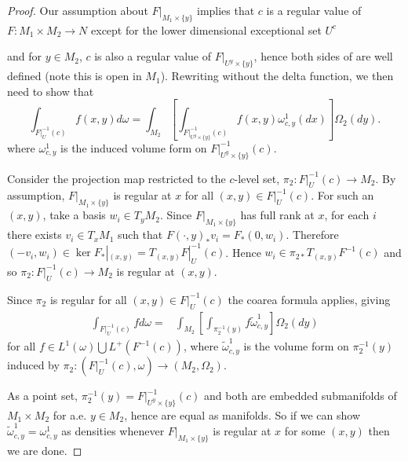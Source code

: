 \begin{proof}
Our assumption about $F|_{M_1\times\{y\}}$ implies that $c$ is a regular value of $F:M_1\times M_2\rightarrow N$ except for the lower dimensional exceptional set $U^c$
\begin{comment}
U is a subset of the set given in the condition.  Both are closed
\end{comment}
and for $y\in M_2$, $c$ is also a regular value of $F|_{U^y\times\{y\}}$, hence both sides of  are well defined (note this is open in $M_1$).  Rewriting  without the delta function, we then need to show that 
\begin{equation}
\int_{F|_U^{-1}(c)} f(x,y) d\omega=\int_{M_2}\left[\int_{F|_{U^y\times\{y\}}^{-1}(c)} f(x,y) \omega^1_{c,y}(dx)\right]\Omega_2(dy).
\end{equation}
where $\omega^1_{c,y}$ is the induced volume form on $F|_{U^y\times\{y\}}^{-1}(c)$.  

Consider the projection map restricted to the $c$-level set, $\pi_2:F|_U^{-1}(c)\rightarrow M_2$.  By assumption, $F|_{M_1\times\{y\}}$ is regular at $x$ for all $(x,y)\in F|_U^{-1}(c)$. For such an $(x,y)$, take a basis $w_i\in T_yM_2$. Since $F|_{M_1\times\{y\}}$ has full rank at $x$, for each $i$ there exists $v_i\in T_xM_1$ such that $F(\cdot,y)_*v_i=F_*(0,w_i)$.  Therefore $(-v_i,w_i)\in \ker F_*|_{(x,y)}=T_{(x,y)}F|_U^{-1}(c)$.  Hence $w_i\in\pi_{2*} T_{(x,y)}F^{-1}(c)$ and so $\pi_2:F|_U^{-1}(c)\rightarrow M_2$ is regular at $(x,y)$.  

Since $\pi_2$ is regular for all $(x,y)\in F|_U^{-1}(c)$ the coarea formula applies, giving
\begin{align}
\int_{F|_U^{-1}(c)}f d\omega=&\int_{M_2}\left[\int_{\pi_2^{-1}(y)}f\tilde{\omega}_{c,y}^1\right]\Omega_2(dy)
\end{align}
for all $f\in L^1(\omega)\bigcup L^+(F^{-1}(c))$, where $\tilde{\omega}_{c,y}^1$ is the volume form on $\pi_2^{-1}(y)$ induced by $\pi_2:(F|_U^{-1}(c),\omega)\rightarrow (M_2,\Omega_2)$.

As a point set, $\pi_2^{-1}(y)=F|_{ U^y\times\{y\}}^{-1}(c)$ and both are embedded submanifolds of $M_1\times M_2$ for a.e. $y\in M_2$, hence are equal as manifolds.  So if we can show $\tilde{\omega}_{c,y}^1=\omega^1_{c,y}$ as densities whenever $F|_{M_1\times\{y\}}$ is regular at $x$ for some $(x,y)$ then we are done.  


\end{proof}
